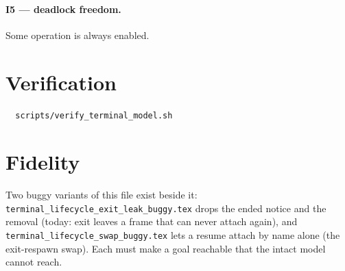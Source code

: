 \documentclass[a4paper,10pt,fleqn]{article}
\begin{document}
\paragraph{I5 --- deadlock freedom.}
Some operation is always enabled.

\section{Verification}
\label{sec:verify}

\begin{verbatim}
  scripts/verify_terminal_model.sh
\end{verbatim}

\section{Fidelity}

Two buggy variants of this file exist beside it:
\texttt{terminal\_lifecycle\_exit\_leak\_buggy.tex} drops the ended
notice and the removal (today: exit leaves a frame that can never attach
again), and \texttt{terminal\_lifecycle\_swap\_buggy.tex} lets a resume
attach by name alone (the exit-respawn swap).  Each must make a goal
reachable that the intact model cannot reach.
\end{document}
